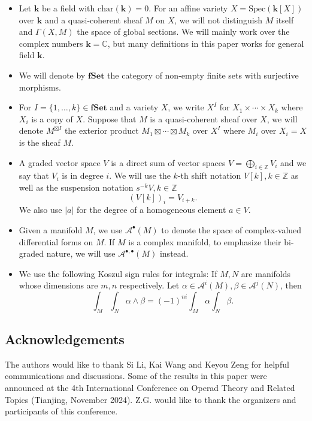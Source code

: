 \documentclass[11pt]{amsart}
\theoremstyle{definition}
\theoremstyle{remark}
\numberwithin{equation}{section}
\newcommand{\CC}{\mathbb{C}}
\newcommand{\bu}{\bullet}
\begin{document}
\begin{itemize}

  \item Let $\mathbf{k}$ be a field with $\mathrm{char}(\mathbf{k})=0$.  %
        For an affine variety $X=\mathrm{Spec}(\mathbf{k}[X])$ over $\mathbf{k}$ and a quasi-coherent sheaf $M$ on $X$, we will not distinguish $M$ itself and $\Gamma(X,M)$ the space of global sections. We will mainly work over the complex numbers $\mathbf{k} = \CC$, but many definitions in this paper works for general field $\mathbf{k}.$

       
\item We will denote by $\mathbf{fSet}$ the category of non-empty finite sets with surjective morphisms.
\item For ${I}=\{1,\dots,k\}\in {\mathbf{fSet}}$ and a variety $X$, we write $X^{{I}}$ for $X_1\times \cdots \times X_k$ where $X_i$ is a copy of $X$. Suppose that $M$ is a quasi-coherent sheaf over $X$, we will denote $M^{\boxtimes{I}}$ the exterior product $M_1\boxtimes \cdots \boxtimes M_k$ over $X^{{I}}$ where $M_i$ over $X_i=X$ is the sheaf $M$.
  \item A graded vector space $V$ is a direct sum of vector spaces $V=\mathop{\bigoplus}\limits_{i\in\mathbb{Z}}V_i$ and we say that $V_{i}$ is in degree $i$.
        We will use the $k$-th shift notation $V[k],k\in \mathbb{Z}$ as well as the suspension notation $s^{-k}V,k\in\mathbb{Z}$
$$
(V[k])_i=V_{i+k}.$$
We also use $|a|$ for the degree of a homogeneous element $a\in V.$
\item Given a manifold $M$, we use $\mathcal{A}^{\bu}(M)$ to denote the space
        of complex-valued differential forms on $M$.
        If $M$ is a
    complex manifold, to emphasize their bi-graded nature, we will use
    $\mathcal{A}^{\bu,\bu} (M)$ instead.
\item We use the following Koszul sign rules for integrals: If $M, N$ are manifolds whose dimensions are $m, n$ respectively. Let $\alpha \in \mathcal{A}^{i}(M),     \beta \in \mathcal{A}^{j}(N)$, then
$$
\int_M \int_N \alpha \wedge\beta = (- 1)^{n i} \int_M \alpha \int_N \beta .
$$
\end{itemize}
\subsection*{Acknowledgements} The authors would like to thank Si Li, Kai Wang and Keyou Zeng for helpful communications and discussions. Some of the results in this paper were announced at the 4th International Conference on Operad Theory and Related Topics (Tianjing, November 2024). Z.G. would like to thank the organizers and participants of this conference.
\end{document}
